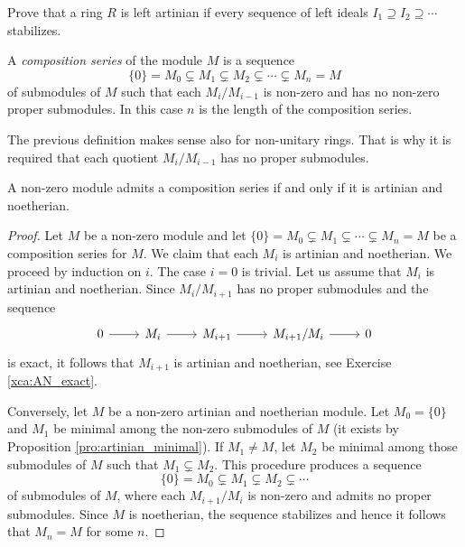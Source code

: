 \begin{exercise}
    Prove that a ring $R$ is left artinian if every sequence of 
    left ideals $I_1\supseteq I_2\supseteq\cdots$ stabilizes. 
\end{exercise}


\begin{definition}
	\label{def:serie_de_composicion}
	A \emph{composition series} of the module $M$ is a sequence 
	\[
		\{0\}=M_0\subsetneq M_1\subsetneq M_2\subsetneq\cdots\subsetneq M_n=M
	\]
	of submodules of $M$ such that each $M_i/M_{i-1}$ is non-zero and has no non-zero 
	proper submodules. 
	In this case 
	$n$ is the length of the composition series.
\end{definition}

The previous definition makes sense also for non-unitary rings. That is why
it is required that each quotient $M_i/M_{i-1}$ has no proper submodules.

\begin{theorem}
	\label{thm:serie_de_composicion}
	A non-zero module admits a composition series if and only if it is artinian and noetherian.
\end{theorem}

\begin{proof}
	Let $M$ be a non-zero module and let $\{0\}=M_0\subsetneq
	M_1\subsetneq\cdots\subsetneq M_n=M$ be a composition series for $M$.
	We claim that each $M_i$ is artinian and noetherian. We proceed by induction on $i$. The case
	$i=0$ is trivial. Let us assume that $M_i$ is artinian and noetherian. Since 
	$M_i/M_{i+1}$ has no proper submodules and the sequence 
	\[
	\begin{tikzcd}
		0 \arrow{r}
		& M_i \arrow{r}
		& M_{i+1} \arrow{r}
		& M_{i+1}/M_i \arrow{r}
		& 0
	\end{tikzcd}
	\]
	is exact, it follows that 
	$M_{i+1}$ is artinian and noetherian, see Exercise \ref{xca:AN_exact}. 

    Conversely, let $M$ be a non-zero  artinian and noetherian module. Let $M_0=\{0\}$ and 
    $M_1$ be minimal among the non-zero  submodules of $M$ (it exists by Proposition \ref{pro:artinian_minimal}).
    If $M_1\ne M$, let 
	$M_2$ be minimal among those submodules of $M$ such that $M_1\subsetneq M_2$. This procedure
	produces a sequence 
	\[
		\{0\}=M_0\subsetneq M_1\subsetneq M_2\subsetneq\cdots
	\]
	of submodules of $M$, where each $M_{i+1}/M_i$ is non-zero and admits no
	proper submodules. Since $M$ is noetherian, the sequence stabilizes and
	hence it follows that $M_n=M$ for some $n$. 
\end{proof}

